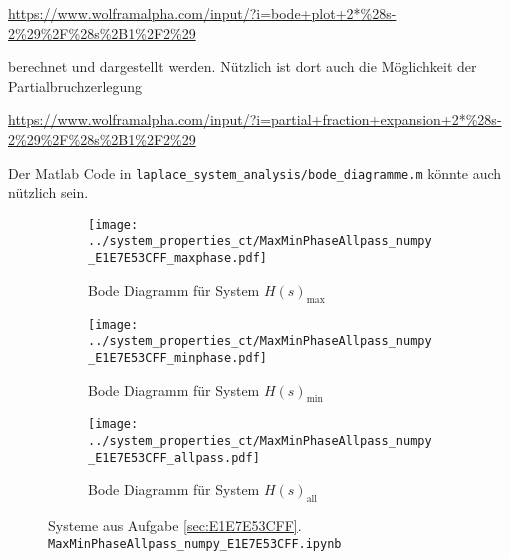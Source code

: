 \url{https://www.wolframalpha.com/input/?i=bode+plot+2*%28s-2%29%2F%28s%2B1%2F2%29}

\noindent  berechnet und dargestellt werden. Nützlich ist dort auch die Möglichkeit
der Partialbruchzerlegung

\url{https://www.wolframalpha.com/input/?i=partial+fraction+expansion+2*%28s-2%29%2F%28s%2B1%2F2%29}

\noindent Der Matlab Code in \texttt{laplace\_system\_analysis/bode\_diagramme.m}
könnte auch nützlich sein.

\clearpage
\begin{figure*}[h]
\centering
\begin{subfigure}{0.7\textwidth}
\texttt{[image: ../system\_properties\_ct/MaxMinPhaseAllpass\_numpy\_E1E7E53CFF\_maxphase.pdf]}
\caption{Bode Diagramm für System $H(s)_\mathrm{max}$}
\label{fig:MaxMinPhaseAllpass_numpy_E1E7E53CFF_maxphase}
\end{subfigure}
\begin{subfigure}{0.7\textwidth}
\texttt{[image: ../system\_properties\_ct/MaxMinPhaseAllpass\_numpy\_E1E7E53CFF\_minphase.pdf]}
\caption{Bode Diagramm für System $H(s)_\mathrm{min}$}
\label{fig:MaxMinPhaseAllpass_numpy_E1E7E53CFF_minphase}
\end{subfigure}
\begin{subfigure}{0.7\textwidth}
\texttt{[image: ../system\_properties\_ct/MaxMinPhaseAllpass\_numpy\_E1E7E53CFF\_allpass.pdf]}
\caption{Bode Diagramm für System $H(s)_\mathrm{all}$}
\label{fig:MaxMinPhaseAllpass_numpy_E1E7E53CFF_allpass}
\end{subfigure}
\caption{Systeme aus Aufgabe \ref{sec:E1E7E53CFF}. \texttt{MaxMinPhaseAllpass\_numpy\_E1E7E53CFF.ipynb}}
\label{fig:MaxMinPhaseAllpass_numpy_E1E7E53CFF}
\end{figure*}
\clearpage


